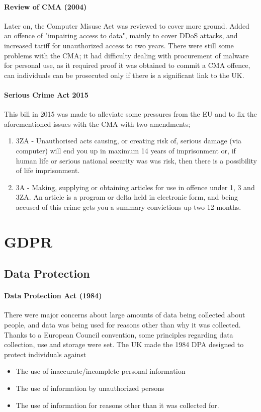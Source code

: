 \paragraph{Review of CMA (2004)} Later on, the Computer Misuse Act was reviewed to cover more ground. Added an offence of "impairing access to data", mainly to cover DDoS attacks, and increased tariff for unauthorized access to two years. There were still some problems with the CMA; it had difficulty dealing with procurement of malware for personal use, as it required proof it was obtained to commit a CMA offence, can individuals can be prosecuted only if there is a significant link to the UK.
\paragraph{Serious Crime Act 2015} This bill in 2015 was made to alleviate some pressures from the EU and to fix the aforementioned issues with the CMA with two amendments;
\begin{enumerate}
	\item 3ZA - Unauthorised acts causing, or creating risk of, serious damage (via computer) will end you up in maximum 14 years of imprisonment or, if human life or serious national security was was risk, then there is a possibility of life imprisonment.
	\item 3A - Making, supplying or obtaining articles for use in offence under 1, 3 and 3ZA. An article is a program or delta held in electronic form, and being accused of this crime gets you a summary convictions up two 12 months.
\end{enumerate}

\section{GDPR}
\subsection{Data Protection}
\paragraph{Data Protection Act (1984)} There were major concerns about large amounts of data being collected about people, and data was being used for reasons other than why it was collected. Thanks to a European Council convention, some principles regarding data collection, use and storage were set. The UK made the 1984 DPA designed to protect individuals against
\begin{itemize}
	\item The use of inaccurate/incomplete personal information
	\item The use of information by unauthorized persons
	\item The use of information for reasons other than it was collected for.
\end{itemize}
